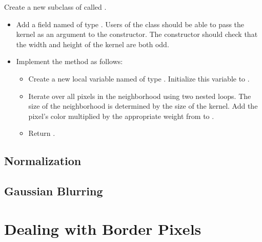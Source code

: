 \documentclass{book}
\begin{document}
\begin{exercise}
Create a new subclass of  called .
\begin{itemize}
  \item Add a field named  of type . Users of the class should be able to pass the kernel as an argument to the constructor. The constructor should check that the width and height of the kernel are both odd.
  \item Implement the method  as follows:
  \begin{itemize}
    \item Create a new  local variable named  of type . Initialize this variable to .
    \item Iterate over all pixels in the neighborhood using two nested  loops. The size of the neighborhood is determined by the size of the kernel. Add the pixel's color multiplied by the appropriate weight from  to .
    \item Return .
  \end{itemize}
\end{itemize}
\end{exercise}


\subsection{Normalization}

\subsection{Gaussian Blurring}



\section{Dealing with Border Pixels}\label{sec:border-pixels}
\end{document}
